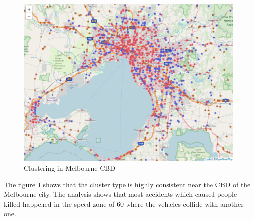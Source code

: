 \documentclass[10pt]{article}
\theoremstyle{definition}
\begin{document}
\begin{minipage}{\linewidth}
  	\centering
  \begin{minipage}{0.49\linewidth}
	\begin{figure}[H]
		\includegraphics[width=\linewidth]{images/cluster3_NoPostcode_CBD.png}
		\caption{Clustering in Melbourne CBD}
		\label{fig:ClusterCBD}
    \end{figure}
  \end{minipage}
  \hspace{0.0\linewidth}
  \begin{minipage}{0.49\linewidth}
     The figure \ref{fig:ClusterCBD} shows that the cluster type is highly consistent near the CBD of the Melbourne city. The analysis shows that most accidents which caused people killed happened in the speed zone of 60 where the vehicles collide with another one.
    \end{minipage}
\end{minipage}\\
\vspace{12pt}\\
\end{document}

